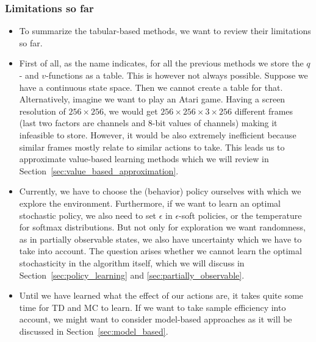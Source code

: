 \subsubsection{Limitations so far}
\begin{itemize}
	\item To summarize the tabular-based methods, we want to review their limitations so far.
	\item First of all, as the name indicates, for all the previous methods we store the $q$- and $v$-functions as a table. This is however not always possible. Suppose we have a continuous state space. Then we cannot create a table for that. Alternatively, imagine we want to play an Atari game. Having a screen resolution of $256\times 256$, we would get $256\times 256\times 3\times 256$ different frames (last two factors are channels and 8-bit values of channels) making it infeasible to store. However, it would be also extremely inefficient because similar frames mostly relate to similar actions to take. This leads us to approximate value-based learning methods which we will review in Section~\ref{sec:value_based_approximation}.
	\item Currently, we have to choose the (behavior) policy ourselves with which we explore the environment. Furthermore, if we want to learn an optimal stochastic policy, we also need to set $\epsilon$ in $\epsilon$-soft policies, or the temperature for softmax distributions. But not only for exploration we want randomness, as in partially observable states, we also have uncertainty which we have to take into account. The question arises whether we cannot learn the optimal stochasticity in the algorithm itself, which we will discuss in Section~\ref{sec:policy_learning} and \ref{sec:partially_observable}.
	\item Until we have learned what the effect of our actions are, it takes quite some time for TD and MC to learn. If we want to take sample efficiency into account, we might want to consider model-based approaches as it will be discussed in Section~\ref{sec:model_based}.
\end{itemize}
